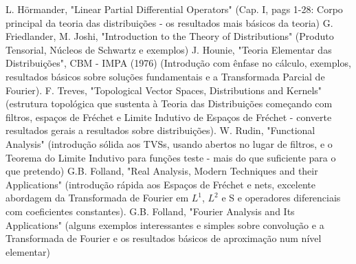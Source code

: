\documentclass[12pt]{article}
\theoremstyle{definition} %
\begin{document}

\newpage

\newpage

\newpage

\newpage

\newpage

\newpage

\newpage

\newpage

\newpage

\newpage

\newpage

\newpage

\newpage

\newpage

\newpage

\begin{thebibliography}{99}
	 L. Hörmander, "Linear Partial Differential Operators" (Cap. I, pags 1-28: Corpo principal da teoria das distribuições - os resultados mais básicos da teoria)
	 G. Friedlander, M. Joshi, "Introduction to the Theory of Distributions" (Produto Tensorial,  Núcleos de Schwartz e exemplos)
	 J. Hounie, "Teoria Elementar das Distribuições", CBM - IMPA (1976) (Introdução com ênfase no cálculo, exemplos, resultados básicos sobre soluções fundamentais e a Transformada Parcial de Fourier).
	 F. Treves, "Topological Vector Spaces, Distributions and Kernels" (estrutura topológica que sustenta à Teoria das Distribuições começando com filtros, espaços de Fréchet e Limite Indutivo de Espaços de Fréchet - converte resultados gerais a resultados sobre distribuições).
	 W. Rudin, "Functional Analysis" (introdução sólida aos TVSs, usando abertos no lugar de filtros, e o Teorema do Limite Indutivo para funções teste - mais do que suficiente para o que pretendo)
	 G.B. Folland, "Real Analysis, Modern Techniques and their Applications" (introdução rápida aos Espaços de Fréchet e nets, excelente abordagem da Transformada de Fourier em \(L^1\), \(L^2\) e S e operadores diferenciais com coeficientes constantes).
	 G.B. Folland, "Fourier Analysis and Its Applications" (alguns exemplos interessantes e simples sobre convolução e a Transformada de Fourier e os resultados básicos de aproximação num nível elementar)
\end{thebibliography}
\end{document}
